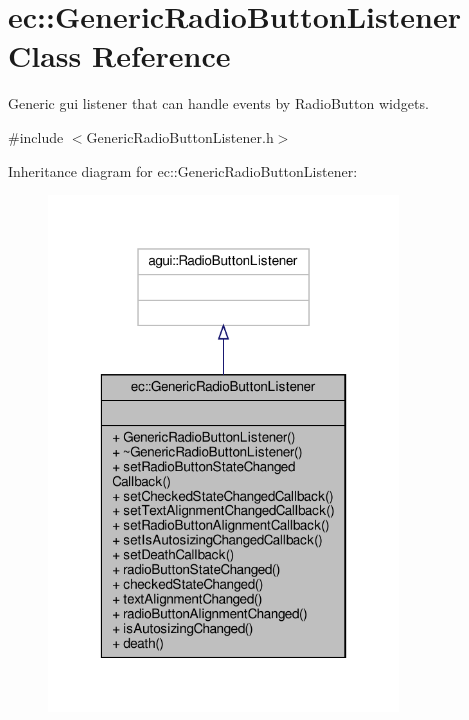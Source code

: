 \hypertarget{classec_1_1_generic_radio_button_listener}{}\section{ec\+:\+:Generic\+Radio\+Button\+Listener Class Reference}
\label{classec_1_1_generic_radio_button_listener}


Generic gui listener that can handle events by Radio\+Button widgets.  




{\ttfamily \#include $<$Generic\+Radio\+Button\+Listener.\+h$>$}



Inheritance diagram for ec\+:\+:Generic\+Radio\+Button\+Listener\+:\nopagebreak
\begin{figure}[H]
\begin{center}
\leavevmode
\includegraphics[width=263pt]{classec_1_1_generic_radio_button_listener__inherit__graph}
\end{center}
\end{figure}


